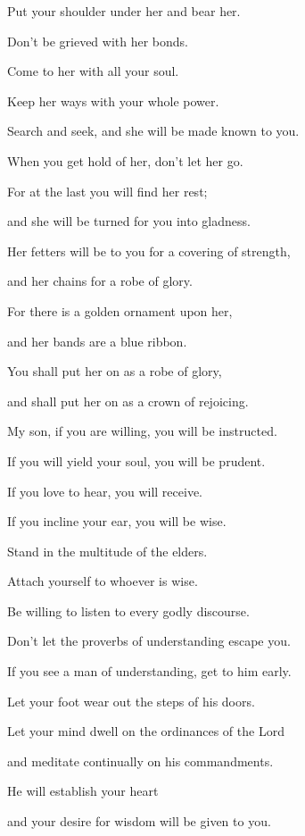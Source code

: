 {\par }{\Q {}Put your shoulder under her and bear her.
\par }{\QB Don’t be grieved with her bonds.
\par }{\Q {}Come to her with all your soul.
\par }{\QB Keep her ways with your whole power.
\par }{\Q {}Search and seek, and she will be made known to you.
\par }{\QB When you get hold of her, don’t let her go.
\par }{\Q {}For at the last you will find her rest;
\par }{\QB and she will be turned for you into gladness.
\par }{\Q {}Her fetters will be to you for a covering of strength,
\par }{\QB and her chains for a robe of glory.
\par }{\Q {}For there is a golden ornament upon her,
\par }{\QB and her bands are
 a blue ribbon.
\par }{\Q {}You shall put her on as a robe of glory,
\par }{\QB and shall put her on as a crown of rejoicing.
\par }{\BB \par }{\Q {}My son, if you are willing, you will be instructed.
\par }{\QB If you will yield your soul, you will be prudent.
\par }{\Q {}If you love to hear, you will receive.
\par }{\QB If you incline your ear, you will be wise.
\par }{\Q {}Stand in the multitude of the elders.
\par }{\QB Attach yourself to whoever is wise.
\par }{\Q {}Be willing to listen to every godly discourse.
\par }{\QB Don’t let the proverbs of understanding escape you.
\par }{\Q {}If you see a man of understanding, get to him early.
\par }{\QB Let your foot wear out the steps of his doors.
\par }{\Q {}Let your mind dwell on the ordinances of the Lord
\par }{\QB and meditate continually on his commandments.
\par }{\Q He will establish your heart
\par }{\QB and your desire for wisdom will be given to you.
\par }{\BB \par }
